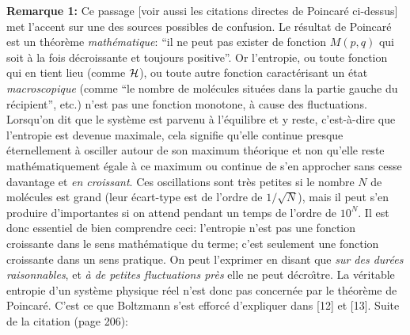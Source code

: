 \medskip
{\bf Remarque 1:} Ce passage [voir aussi les citations directes de 
Poincar\'e ci-dessus] met l'accent sur une des 
sources possibles de confusion. Le r\'esultat de Poincar\'e est un 
th\'eor\`eme {\it math\'ematique}: ``il ne peut pas exister de fonction 
$M(p,q)$ qui soit \`a la fois d\'ecroissante et toujours positive''. 
Or l'entropie, ou toute fonction qui en tient lieu (comme ${\cal H}$), 
ou toute autre fonction caract\'erisant un \'etat {\it macroscopique} 
(comme ``le nombre de mol\'ecules situ\'ees dans la partie gauche du 
r\'ecipient'', etc.) n'est pas une fonction monotone, \`a cause des 
fluctuations. Lorsqu'on dit que le syst\`eme est parvenu \`a 
l'\'equilibre et y reste, c'est-\`a-dire que l'entropie est devenue 
maximale, cela signifie qu'elle continue presque \'eternellement 
\`a osciller autour de son maximum th\'eorique et non qu'elle 
reste math\'ematiquement \'egale \`a ce maximum ou continue de s'en 
approcher sans cesse davantage et {\it en croissant}. Ces oscillations 
sont tr\`es petites si le nombre $N$ de mol\'ecules est grand (leur 
\'ecart-type est de l'ordre de $1 / \sqrt{N}$), mais il peut s'en 
produire d'importantes si on attend pendant un temps de l'ordre de 
$10^N$. Il est donc essentiel de bien comprendre ceci: l'entropie n'est 
pas une fonction croissante dans le sens math\'ematique du terme; c'est 
seulement une fonction croissante dans un sens pratique. On peut 
l'exprimer en disant que {\it sur des dur\'ees raisonnables}, et 
{\it \`a de petites fluctuations pr\`es} elle ne peut d\'ecro{\^\i}tre. 
La v\'eritable entropie d'un syst\`eme physique r\'eel n'est donc pas 
concern\'ee par le th\'eor\`eme de Poincar\'e. C'est ce que Boltzmann 
s'est efforc\'e d'expliquer dans [12] et [13].
\medskip
Suite de la citation (page 206):
\medskip
